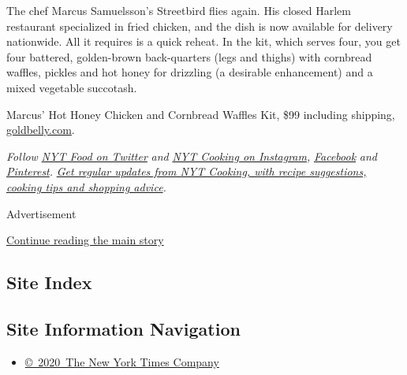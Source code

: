 The chef Marcus Samuelsson's Streetbird flies again. His closed Harlem
restaurant specialized in fried chicken, and the dish is now available
for delivery nationwide. All it requires is a quick reheat. In the kit,
which serves four, you get four battered, golden-brown back-quarters
(legs and thighs) with cornbread waffles, pickles and hot honey for
drizzling (a desirable enhancement) and a mixed vegetable succotash.

Marcus' Hot Honey Chicken and Cornbread Waffles Kit, \$99 including
shipping,
\href{https://www.goldbelly.com/marcus-samuelssons-streetbird/hot-honey-chicken-and-cornbread-waffles-for-2}{goldbelly.com}.

\emph{Follow} \href{https://twitter.com/nytfood}{\emph{NYT Food on
Twitter}} \emph{and}
\href{https://www.instagram.com/nytcooking/}{\emph{NYT Cooking on
Instagram}}\emph{,}
\href{https://www.facebook.com/nytcooking/}{\emph{Facebook}} \emph{and}
\href{https://www.pinterest.com/nytcooking/}{\emph{Pinterest}}\emph{.}
\href{https://www.nytimes.com/newsletters/cooking}{\emph{Get regular
updates from NYT Cooking, with recipe suggestions, cooking tips and
shopping advice}}\emph{.}

Advertisement

\protect\hyperlink{after-bottom}{Continue reading the main story}

\hypertarget{site-index}{%
\subsection{Site Index}\label{site-index}}

\hypertarget{site-information-navigation}{%
\subsection{Site Information
Navigation}\label{site-information-navigation}}

\begin{itemize}
\tightlist
\item
  \href{https://help.nytimes.com/hc/en-us/articles/115014792127-Copyright-notice}{©~2020~The
  New York Times Company}
\end{itemize}

